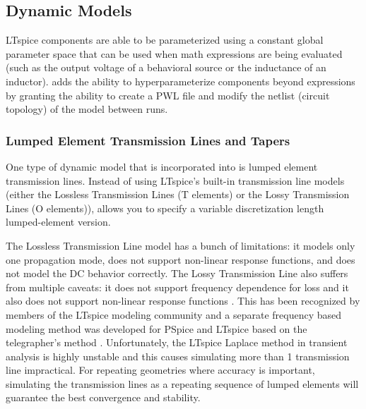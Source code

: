




\subsection{Dynamic Models} \label{dyn_models}

LTspice components are able to be parameterized using a constant global parameter space that can be used when
math expressions are being evaluated (such as the output voltage of a behavioral source or the inductance 
of an inductor).  adds the ability to hyperparameterize components beyond expressions by granting the
ability to create a PWL file and modify the netlist (circuit topology) of the model between runs.

\subsubsection{Lumped Element Transmission Lines and Tapers}\label{tapers_section}

One type of dynamic model that is incorporated into  is lumped 
element transmission lines. Instead of using LTspice's built-in transmission
line models (either the Lossless Transmission Lines (T elements) or the 
Lossy Transmission Lines (O elements)),  allows you to specify a
variable discretization length lumped-element version. 

The Lossless Transmission Line model has a bunch of limitations: it models only one propagation mode,
 does not support non-linear response functions, and does not 
model the DC behavior correctly. The Lossy Transmission Line also suffers from multiple caveats:
it does not support frequency dependence for loss and it also does not support non-linear response 
functions \cite{ltwiki_tline_issues}. This has been recognized by members of the 
LTspice modeling community and a separate frequency based modeling method was developed
for PSpice and LTspice based on the telegrapher's method \cite{camron_model_tline}. Unfortunately, the LTspice
Laplace method in transient analysis is highly unstable and this causes simulating 
more than 1 transmission line impractical. For repeating geometries where accuracy is important, simulating the
transmission lines as a repeating sequence of lumped elements will guarantee the best
convergence and stability.

